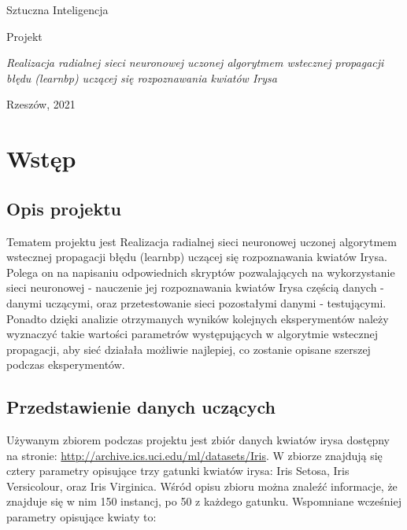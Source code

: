 \documentclass[a4paper, 12pt]{report}
\begin{document}
\begin{titlepage}
\begin{center}
\huge {Sztuczna Inteligencja}

\vspace{6cm}

\huge  Projekt

\vspace{2cm}

\Large \textit{Realizacja radialnej sieci neuronowej uczonej algorytmem wstecznej propagacji błędu (learnbp) uczącej się rozpoznawania kwiatów Irysa }

\vspace{8cm}

\large {}
\large {}

\vspace{3cm}
Rzeszów, 2021

\end{center}
\end{titlepage}

\tableofcontents{}
\pagebreak

\chapter{Wstęp}
\section {Opis projektu}
Tematem projektu jest Realizacja radialnej sieci neuronowej uczonej algorytmem wstecznej propagacji błędu (learnbp) uczącej się rozpoznawania kwiatów Irysa. Polega on na napisaniu odpowiednich skryptów pozwalających na wykorzystanie sieci neuronowej - nauczenie jej rozpoznawania kwiatów Irysa częścią danych - danymi uczącymi, oraz przetestowanie sieci pozostałymi danymi - testującymi. Ponadto dzięki analizie otrzymanych wyników kolejnych eksperymentów należy wyznaczyć takie wartości parametrów występujących w algorytmie wstecznej propagacji, aby sieć działała możliwie najlepiej, co zostanie opisane szerszej podczas eksperymentów.
\section {Przedstawienie danych uczących}

Używanym zbiorem podczas projektu jest zbiór danych kwiatów irysa dostępny na stronie: \url {http://archive.ics.uci.edu/ml/datasets/Iris}. W zbiorze znajdują się cztery parametry opisujące trzy gatunki kwiatów irysa: Iris Setosa, Iris Versicolour, oraz Iris Virginica. Wśród opisu zbioru można znaleźć informacje, że znajduje się w nim 150 instancj, po 50 z każdego gatunku. Wspomniane wcześniej parametry opisujące kwiaty to:
\end{document}
